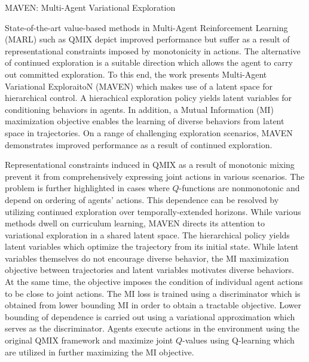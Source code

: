 \documentclass[11pt,letterpaper]{article}
\begin{document}
\begin{center}
  \large{MAVEN: Multi-Agent Variational Exploration}
\end{center}

State-of-the-art value-based methods in Multi-Agent Reinforcement Learning (MARL) such as QMIX depict improved performance but suffer as a result of representational constraints imposed by monotonicity in actions. The alternative of continued exploration is a suitable direction which allows the agent to carry out committed exploration. To this end, the work presents Multi-Agent Variational ExploraitoN (MAVEN) which makes use of a latent space for hierarchical control. A hierachical exploration policy yields latent variables for conditioning behaviors in agents. In addition, a Mutual Information (MI) maximization objective enables the learning of diverse behaviors from latent space in trajectories. On a range of challenging exploration scenarios, MAVEN demonstrates improved performance as a result of continued exploration. 

Representational constraints induced in QMIX as a result of monotonic mixing prevent it from comprehensively expressing joint actions in various scenarios. The problem is further highlighted in cases where $Q$-functions are nonmonotonic and depend on ordering of agents' actions. This dependence can be resolved by utilizing continued exploration over temporally-extended horizons. While various methods dwell on curriculum learning, MAVEN directs its attention to variational exploration in a shared latent space. The hierarchical policy yields latent variables which optimize the trajectory from its initial state. While latent variables themselves do not encourage diverse behavior, the MI maximization objective between trajectories and latent variables motivates diverse behaviors. At the same time, the objective imposes the condition of individual agent actions to be close to joint actions. The MI loss is trained using a discriminator which is obtained from lower bounding MI in order to obtain a tractable objective. Lower bounding of dependence is carried out using a variational approximation which serves as the discriminator. Agents execute actions in the environment using the original QMIX framework and maximize joint $Q$-values using Q-learning which are utilized in further maximizing the MI objective.    
\end{document}
